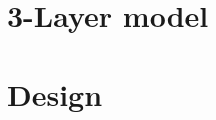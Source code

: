 \hypertarget{_design_model_sec}{}\section{3-\/\+Layer model}\label{_design_model_sec}
\hypertarget{_design_design_sec}{}\section{Design}\label{_design_design_sec}
